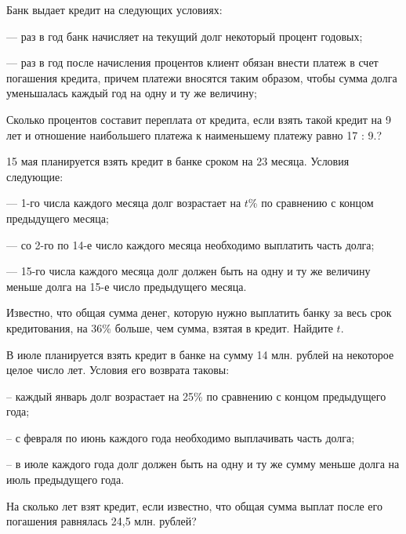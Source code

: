  Банк выдает кредит на следующих условиях:

— раз в год банк начисляет на текущий долг некоторый процент годовых;

— раз в год после начисления процентов клиент обязан внести платеж в счет погашения
кредита, причем платежи вносятся таким образом, чтобы сумма долга уменьшалась каждый
год на одну и ту же величину;

Сколько процентов составит переплата от кредита, если взять такой кредит на 9 лет и отношение наибольшего платежа к наименьшему платежу равно 17 : 9.?

 15 мая планируется взять кредит в банке сроком на 23 месяца. Условия следующие: 

— 1-го числа каждого месяца долг возрастает на $t$\% по сравнению с концом предыдущего
месяца;

— со 2-го по 14-е число каждого месяца необходимо выплатить часть долга;

— 15-го числа каждого месяца долг должен быть на одну и ту же величину меньше долга
на 15-е число предыдущего месяца.

Известно, что общая сумма денег, которую нужно выплатить банку за весь срок кредитования, на 36\% больше, чем сумма, взятая в кредит. Найдите $t$.

 В июле планируется взять кредит в банке на сумму 14 млн. рублей на некоторое целое
число лет. Условия его возврата таковы:

– каждый январь долг возрастает на 25\% по сравнению с концом предыдущего года;

– с февраля по июнь каждого года необходимо выплачивать часть долга;

– в июле каждого года долг должен быть на одну и ту же сумму меньше долга на июль
предыдущего года.

На сколько лет взят кредит, если известно, что общая сумма выплат после его погашения
равнялась 24,5 млн. рублей?
